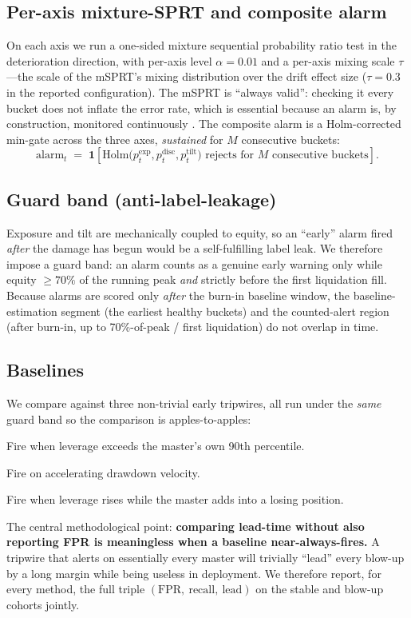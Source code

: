 \documentclass[11pt,a4paper]{article}
\newcommand{\fpr}{\mathrm{FPR}}
\begin{document}
\subsection{Per-axis mixture-SPRT and composite alarm}
On each axis we run a one-sided mixture sequential probability ratio test
\citep{wald1945sprt,johari2017peeking} in the deterioration direction, with
per-axis level $\alpha = 0.01$ and a per-axis mixing scale $\tau$---the scale of the
mSPRT's mixing distribution over the drift effect size ($\tau = 0.3$ in the reported
configuration). The mSPRT is ``always valid'': checking it every
bucket does not inflate the error rate, which is essential because an alarm is, by
construction, monitored continuously \citep{johari2017peeking}. The composite alarm
is a Holm-corrected \citep{holm1979simple} min-gate across the three axes,
\emph{sustained} for $M$ consecutive buckets:
\begin{equation}
\text{alarm}_t \;=\; \mathbf{1}\!\left[
\text{Holm}\!\big(p^{\text{exp}}_t, p^{\text{disc}}_t, p^{\text{tilt}}_t\big)
\text{ rejects for } M \text{ consecutive buckets}\right].
\end{equation}

\subsection{Guard band (anti-label-leakage)}
Exposure and tilt are mechanically coupled to equity, so an ``early'' alarm fired
\emph{after} the damage has begun would be a self-fulfilling label leak. We
therefore impose a guard band: an alarm counts as a genuine early warning only
while equity $\geq 70\%$ of the running peak \emph{and} strictly before the first
liquidation fill. Because alarms are scored only \emph{after} the burn-in baseline
window, the baseline-estimation segment (the earliest healthy buckets) and the
counted-alert region (after burn-in, up to 70\%-of-peak / first liquidation) do not
overlap in time.

\subsection{Baselines}
We compare against three non-trivial early tripwires, all run under the
\emph{same} guard band so the comparison is apples-to-apples:
\begin{description}[leftmargin=1.6em,itemsep=2pt]
  \item[B1 --- leverage-p90 tripwire.] Fire when leverage exceeds the master's own
        90th percentile.
  \item[B2 --- drawdown-velocity.] Fire on accelerating drawdown velocity.
  \item[B3 --- leverage-up-and-add.] Fire when leverage rises while the master adds
        into a losing position.
\end{description}
The central methodological point: \textbf{comparing lead-time without also
reporting FPR is meaningless when a baseline near-always-fires.} A tripwire that
alerts on essentially every master will trivially ``lead'' every blow-up by a long
margin while being useless in deployment. We therefore report, for every method,
the full triple $(\fpr,\ \text{recall},\ \text{lead})$ on the stable and blow-up
cohorts jointly.
\end{document}
